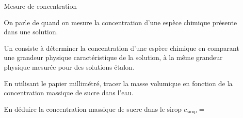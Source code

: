 \begin{doc}{Mesure de concentration}
  \begin{importants}
    On parle de  quand on mesure la concentration d'une espèce chimique présente dans une solution.
  \end{importants}
  \begin{importants}
    Un  consiste à déterminer la concentration d’une espèce chimique en comparant une grandeur physique caractéristique de la solution, à la même grandeur physique mesurée pour des solutions étalon.
  \end{importants}
\end{doc}
 
\numeroQuestion 
En utilisant le papier millimétré, tracer la masse volumique en fonction de la concentration massique de sucre dans l'eau.

\numeroQuestion
En déduire la concentration massique de sucre dans le sirop $c_\text{sirop} =$ 



